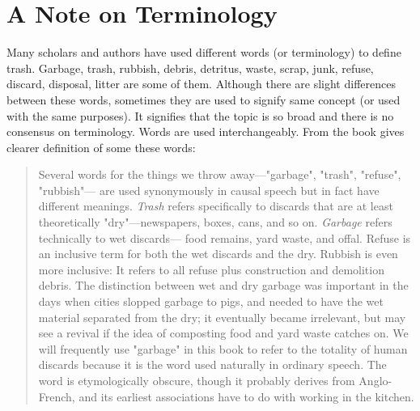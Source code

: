 %
\section{A Note on Terminology}
Many scholars and authors have used different words (or terminology) to define trash. Garbage, trash, rubbish, debris, detritus, waste, scrap, junk, refuse, discard, disposal, litter are some of them. Although there are slight differences between these words, sometimes they are used to signify same concept (or used with the same purposes). It signifies that the topic is so broad and there is no consensus on terminology. Words are used interchangeably. From the book  gives clearer definition of some these words:


\begin{quote}
Several words for the things we throw away---"garbage", "trash", "refuse", "rubbish"--- are used synonymously in causal speech but in fact have different meanings. \textit{Trash} refers specifically to discards that are at least theoretically "dry"---newspapers, boxes, cans, and so on. \textit{Garbage} refers technically to wet discards--- food remains, yard waste, and offal. Refuse is an inclusive term for both the wet discards and the dry. Rubbish is even more inclusive: It refers to all refuse plus construction and demolition debris. The distinction between wet and dry garbage was important in the days when cities slopped garbage to pigs, and needed to have the wet material separated from the dry; it eventually became irrelevant, but may see a revival if the idea of composting food and yard waste catches on. We will frequently use "garbage" in this book to refer to the totality of human discards because it is the word used naturally in ordinary speech. The word is etymologically obscure, though it probably derives from Anglo-French, and its earliest associations have to do with working in the kitchen.
\end{quote}


